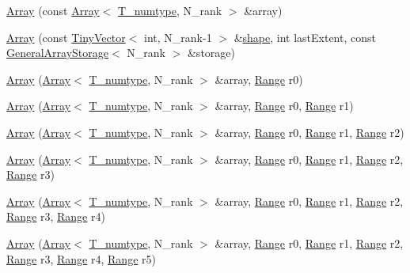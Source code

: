 \begin{DoxyCompactItemize}
\item 
\hyperlink{classArray_aae3f503c4e24baf1e34676fb2051ebdc}{Array} (const \hyperlink{classArray}{Array}$<$ \hyperlink{classArray_ae72770f4a1d2f8b7193badafc320f008}{T\+\_\+numtype}, N\+\_\+rank $>$ \&array)
\item 
\hyperlink{classArray_a1a4bfc463ae3ec6e66f8db5eacae42b7}{Array} (const \hyperlink{classTinyVector}{Tiny\+Vector}$<$ int, N\+\_\+rank-\/1 $>$ \&\hyperlink{classArray_aab2fe0a092fc7acfcdbac8e24dfc1252}{shape}, int last\+Extent, const \hyperlink{classGeneralArrayStorage}{General\+Array\+Storage}$<$ N\+\_\+rank $>$ \&storage)
\item 
\hyperlink{classArray_a23685ffa9c88e01d44e57bff381c8eea}{Array} (\hyperlink{classArray}{Array}$<$ \hyperlink{classArray_ae72770f4a1d2f8b7193badafc320f008}{T\+\_\+numtype}, N\+\_\+rank $>$ \&array, \hyperlink{classRange}{Range} r0)
\item 
\hyperlink{classArray_adeb9d3d9688c1991f7e6de60c24072f6}{Array} (\hyperlink{classArray}{Array}$<$ \hyperlink{classArray_ae72770f4a1d2f8b7193badafc320f008}{T\+\_\+numtype}, N\+\_\+rank $>$ \&array, \hyperlink{classRange}{Range} r0, \hyperlink{classRange}{Range} r1)
\item 
\hyperlink{classArray_aa715fe702709fb8bf943ea36391c25a7}{Array} (\hyperlink{classArray}{Array}$<$ \hyperlink{classArray_ae72770f4a1d2f8b7193badafc320f008}{T\+\_\+numtype}, N\+\_\+rank $>$ \&array, \hyperlink{classRange}{Range} r0, \hyperlink{classRange}{Range} r1, \hyperlink{classRange}{Range} r2)
\item 
\hyperlink{classArray_a5ed992128a3321bbf63c84453e4c7379}{Array} (\hyperlink{classArray}{Array}$<$ \hyperlink{classArray_ae72770f4a1d2f8b7193badafc320f008}{T\+\_\+numtype}, N\+\_\+rank $>$ \&array, \hyperlink{classRange}{Range} r0, \hyperlink{classRange}{Range} r1, \hyperlink{classRange}{Range} r2, \hyperlink{classRange}{Range} r3)
\item 
\hyperlink{classArray_a8267a048ca4ac2d83c8a12639ff7e77b}{Array} (\hyperlink{classArray}{Array}$<$ \hyperlink{classArray_ae72770f4a1d2f8b7193badafc320f008}{T\+\_\+numtype}, N\+\_\+rank $>$ \&array, \hyperlink{classRange}{Range} r0, \hyperlink{classRange}{Range} r1, \hyperlink{classRange}{Range} r2, \hyperlink{classRange}{Range} r3, \hyperlink{classRange}{Range} r4)
\item 
\hyperlink{classArray_a56c9149e233fa8e70c8766da66afde43}{Array} (\hyperlink{classArray}{Array}$<$ \hyperlink{classArray_ae72770f4a1d2f8b7193badafc320f008}{T\+\_\+numtype}, N\+\_\+rank $>$ \&array, \hyperlink{classRange}{Range} r0, \hyperlink{classRange}{Range} r1, \hyperlink{classRange}{Range} r2, \hyperlink{classRange}{Range} r3, \hyperlink{classRange}{Range} r4, \hyperlink{classRange}{Range} r5)

\end{DoxyCompactItemize}
